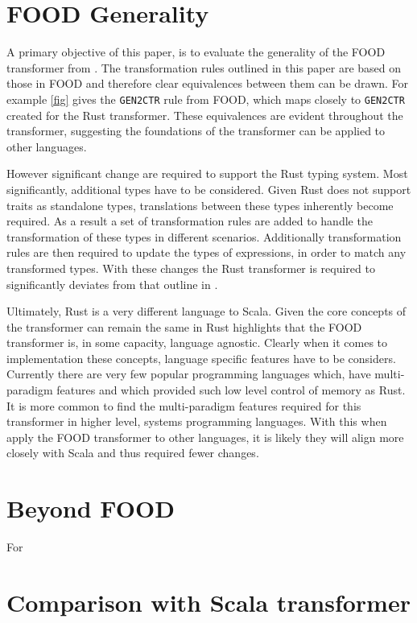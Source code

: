 \documentclass[ oneside,%
                    author={James Elgar},
                    degree={MEng},
                     title={Bidirectional transformer between functional and \\ object-oriented programming in Rust},
                  subtitle={}]{dissertation}
\begin{document}
\section{FOOD Generality} 

A primary objective of this paper, is to evaluate the generality of the FOOD transformer from \cite{food}.
The transformation rules outlined in this paper are based on those in FOOD and therefore clear equivalences between them can be drawn. For example \autoref{fig} gives the \verb|GEN2CTR| rule from FOOD, which maps closely to \verb|GEN2CTR| created for the Rust transformer. These equivalences are evident throughout the transformer, suggesting the foundations of the transformer can be applied to other languages.

However significant change are required to support the Rust typing system. Most significantly, additional types have to be considered. Given Rust does not support traits as standalone types, translations between these types inherently become required. As a result a set of transformation rules are added to handle the transformation of these types in different scenarios. Additionally transformation rules are then required to update the types of expressions, in order to match any transformed types. With these changes the Rust transformer is required to significantly deviates from  that outline in \cite{food}. 

Ultimately, Rust is a very different language to Scala. Given the core concepts of the transformer can remain the same in Rust highlights that the FOOD transformer is, in some capacity, language agnostic. Clearly when it comes to implementation these concepts, language specific features have to be considers. Currently there are very few popular programming languages which, have multi-paradigm features and which provided such low level control of memory as Rust. It is more common to find the multi-paradigm features required for this transformer in higher level, systems programming languages. With this when apply the FOOD transformer to other languages, it is likely they will align more closely with Scala and thus required fewer changes.

\section{Beyond FOOD} 

For

\section{Comparison with Scala transformer} 
\end{document}
